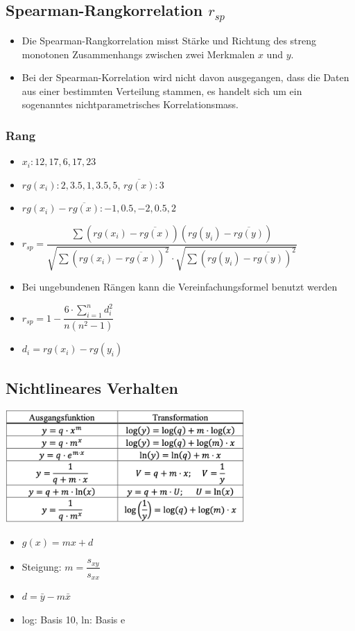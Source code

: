 \documentclass[8pt,a4paper]{scrartcl}
\begin{document}
\begin{multicols*}{3}
			\subsection{Spearman-Rangkorrelation $r_{sp}$}		
				\begin{itemize}\itemsep0pt				
					\item Die Spearman-Rangkorrelation misst Stärke und Richtung des streng monotonen Zusammenhangs zwischen  zwei Merkmalen $x$ und $y$.
					\item Bei  der  Spearman-Korrelation  wird  nicht  davon ausgegangen,  dass  die  Daten  aus  einer bestimmten  Verteilung stammen,  es  handelt  sich  um  ein sogenanntes nichtparametrisches Korrelationsmass. 
				\end{itemize}		
					
				\subsubsection{Rang}		
					\begin{itemize}\itemsep0pt				
					\item $x_{i}: 12, 17, 6, 17, 23$
					\item $rg(x_{i}): 2, 3.5, 1, 3.5, 5$,  $\overline{rg(x)}: 3$
					\item $rg(x_{i})-\overline{rg(x)}: -1, 0.5, -2, 0.5, 2$
					\item $r_{sp}=\dfrac{\sum (rg(x_{i})-\overline{rg(x)})(rg(y_{i})-\overline{rg(y)})}{\sqrt{\sum (rg(x_{i})-\overline{rg(x)})^{2}} \cdot \sqrt{\sum (rg(y_{i})-\overline{rg(y)})^{2}}}$
					\item Bei ungebundenen Rängen kann die Vereinfachungsformel benutzt werden
					\item $r_{sp}=1-\dfrac{6\cdot \sum_{i=1}^{n}d_{i}^{2}}{n(n^{2}-1)}$
					\item $d_{i} = rg(x_{i})-rg(y_{i})$
					
				\end{itemize}
				
			 \subsection{Nichtlineares Verhalten}
			     \includegraphics[height=4.3cm]{img/regression1.png}
			     \begin{itemize}\itemsep0pt				
					\item $g(x) = mx + d$
					\item Steigung: $m = \dfrac{s_{xy}}{s_{xx}}$
					\item $d = \bar{y} - m\bar{x}$
					\item log: Basis 10, ln: Basis e
				\end{itemize}



\end{multicols*}
\end{document}
